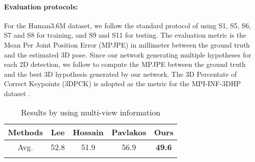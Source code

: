 \documentclass[10pt,twocolumn,letterpaper]{article}
\begin{document}
\paragraph{Evaluation protocols:}  For the Human3.6M dataset, we follow the standard protocol of using S1, S5, S6, S7 and S8 for training, and S9 and S11 for testing. The evaluation metric is the Mean Per Joint Position Error (MPJPE) in millimeter between the ground truth and the estimated 3D pose. Since our network generating multiple hypotheses for each 2D detection, we follow \cite{jahangiri2017generating} to compute the MPJPE between the ground truth and the best 3D hypothesis generated by our network. The 3D Percentate of Correct Keypoints (3DPCK) \cite{mehta2017monocular} is adopted as the metric for the MPI-INF-3DHP dataset . 














\begin{table}[htp]
\caption{Results by using multi-view information}
\vspace{-2mm}
\centering
\small
\setlength{\tabcolsep}{3.8pt}
\begin{tabular*}{0.45\textwidth}{ c c c c c } 
 \hline
Methods  & Lee\cite{lee2018propagating} & Hossain\cite{hossain2018exploiting} &  Pavlakos \cite{pavlakos2017harvesting} & Ours\\ 
 \hline

  Avg. & 52.8 & 51.9 & 56.9  & \bf 49.6  \\
  \hline
  \vspace{-5mm}

\end{tabular*}
\label{Tab:multi-view}
\end{table}
\end{document}
